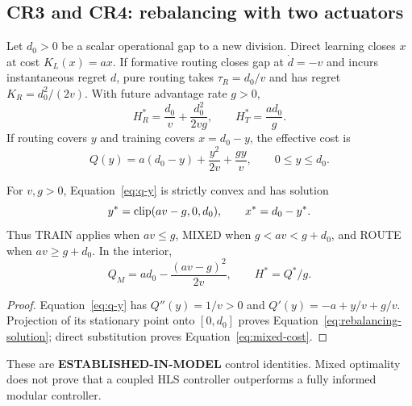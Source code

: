 \subsection{CR3 and CR4: rebalancing with two actuators}
Let $d_0>0$ be a scalar operational gap to a new division. Direct learning closes $x$ at cost $K_L(x)=ax$. If formative routing closes gap at $\dot d=-v$ and incurs instantaneous regret $d$, pure routing takes $\tau_R=d_0/v$ and has regret $K_R=d_0^2/(2v)$. With future advantage rate $g>0$,
\begin{equation}
H_R^*=\frac{d_0}{v}+\frac{d_0^2}{2vg},\qquad H_T^*=\frac{ad_0}{g}.
\label{eq:pure-rebalancing}
\end{equation}
If routing covers $y$ and training covers $x=d_0-y$, the effective cost is
\begin{equation}
Q(y)=a(d_0-y)+\frac{y^2}{2v}+\frac{gy}{v},\qquad 0\leq y\leq d_0.
\label{eq:q-y}
\end{equation}
\begin{proposition}
For $v,g>0$, Equation~\eqref{eq:q-y} is strictly convex and has solution
\begin{equation}
y^*=\operatorname{clip}(av-g,0,d_0),\qquad x^*=d_0-y^*.
\label{eq:rebalancing-solution}
\end{equation}
Thus TRAIN applies when $av\leq g$, MIXED when $g<av<g+d_0$, and ROUTE when $av\geq g+d_0$. In the interior,
\begin{equation}
Q_M=ad_0-\frac{(av-g)^2}{2v},\qquad H^*=Q^*/g.
\label{eq:mixed-cost}
\end{equation}
\end{proposition}
\begin{proof}
Equation~\eqref{eq:q-y} has $Q''(y)=1/v>0$ and $Q'(y)=-a+y/v+g/v$. Projection of its stationary point onto $[0,d_0]$ proves Equation~\eqref{eq:rebalancing-solution}; direct substitution proves Equation~\eqref{eq:mixed-cost}.
\end{proof}
These are \textbf{ESTABLISHED-IN-MODEL} control identities. Mixed optimality does not prove that a coupled HLS controller outperforms a fully informed modular controller.
